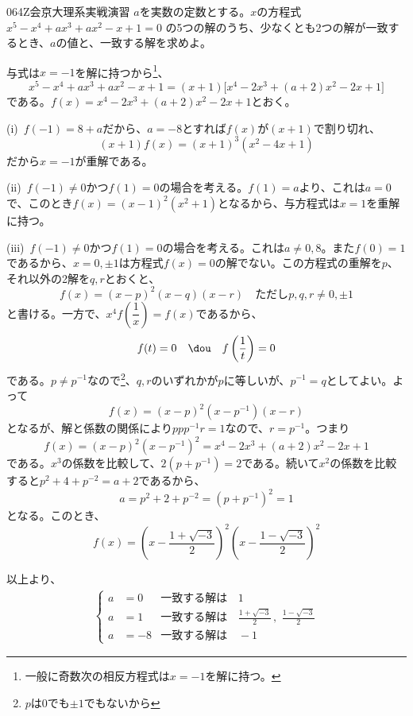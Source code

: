 \begin{prob}{064}{}{Z会京大理系実戦演習}
 $a$を実数の定数とする。$x$の方程式 $x^5-x^4+ax^3+ax^2-x+1=0$ の5つの解のうち、少なくとも2つの解が一致するとき、$a$の値と、一致する解を求めよ。
\end{prob}
与式は$x=-1$を解に持つから\footnote{一般に奇数次の相反方程式は$x=-1$を解に持つ。}、
\[ x^5-x^4+ax^3+ax^2-x+1=(x+1)\bigl[x^4-2x^3+(a+2)x^2-2x+1\bigr] \]
である。$f(x)=x^4-2x^3+(a+2)x^2-2x+1$とおく。

(i)~$f(-1)=8+a$だから、$a=-8$とすれば$f(x)$が$(x+1)$で割り切れ、
\[ (x+1)f(x)=(x+1)^3(x^2-4x+1) \]
だから$x=-1$が重解である。

(ii)~$f(-1)\neq 0$かつ$f(1)=0$の場合を考える。$f(1)=a$より、これは$a=0$で、このとき$f(x)=(x-1)^2(x^2+1)$となるから、与方程式は$x=1$を重解に持つ。

(iii)~$f(-1)\neq 0$かつ$f(1)=0$の場合を考える。これは$a\neq 0, 8$。また$f(0)=1$であるから、$x=0, \pm 1$は方程式$f(x)=0$の解でない。この方程式の重解を$p$、それ以外の2解を$q, r$とおくと、
\[ f(x)=(x-p)^2(x-q)(x-r) \quad \text{ただし$p, q, r\neq 0, \pm 1$} \]
と書ける。一方で、$x^4f\left(\dfrac{1}{x}\right)=f(x)$であるから、
\[ f(t)=0 \quad\dou\quad f\left(\frac{1}{t}\right)=0 \]
である。$p\neq p^{-1}$なので\footnote{$p$は$0$でも$\pm 1$でもないから}、$q, r$のいずれかが$p$に等しいが、$p^{-1}=q$としてよい。よって
\[ f(x)=(x-p)^2(x-p^{-1})(x-r) \]
となるが、解と係数の関係により$ppp^{-1}r=1$なので、$r=p^{-1}$。つまり
\[ f(x)=(x-p)^2(x-p^{-1})^2=x^4-2x^3+(a+2)x^2-2x+1 \]
である。$x^3$の係数を比較して、$2(p+p^{-1})=2$である。続いて$x^2$の係数を比較すると$p^2+4+p^{-2}=a+2$であるから、
\[ a=p^2+2+p^{-2}=(p+p^{-1})^2=1 \]
となる。このとき、
\[ f(x)=\left(x-\frac{1+\sqrt{-3}}{2}\right)^2\left(x-\frac{1-\sqrt{-3}}{2}\right)^2 \]

以上より、
\begin{align*}
 \left\{
 \begin{aligned}
  a&=0 & \text{一致する解は}&\, 1 \\
  a&=1 & \text{一致する解は}&\, \frac{1+\sqrt{-3}}{2}\,,\,\, \frac{1-\sqrt{-3}}{2} \\
  a&=-8 & \text{一致する解は}&\, -1
 \end{aligned}
 \right.
\end{align*}